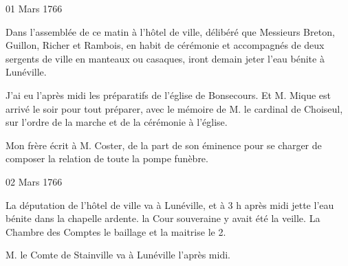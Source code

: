                      
                     \begin{diary}{01 Mars 1766}{}
                        
                         Dans l'assemblée de ce matin à
                              l'hôtel
                              de ville, délibéré que Messieurs
                           Breton, Guillon,
                           Richer et Rambois, en habit de cérémonie
                           et accompagnés de deux sergents de ville
                           en manteaux ou casaques,
                           iront demain
                           jeter l'eau bénite à Lunéville. \bigskip
        
        
                         J'ai eu l'après midi les préparatifs
                           de
                           l’église de
                              Bonsecours. Et M. Mique est
                           arrivé le soir pour tout préparer, avec
                           le mémoire de M. le cardinal de Choiseul,
                           sur l'ordre de la marche et de la
                           cérémonie à l’église. \bigskip
        
        
                        
                           Mon frère écrit à M.
                              Coster, de la part
                           de son éminence pour se charger de composer
                           la relation de toute la pompe funèbre. \bigskip
        
        
                     \end{diary}

                     \begin{diary}{02 Mars 1766}{}
                        
                         La députation de l'hôtel de
                              ville va à Lunéville,
                           et à 3 h après midi jette l'eau bénite dans
                           la chapelle ardente. la Cour
                              souveraine
                           y avait été la veille. La Chambre des Comptes
                           le
                              baillage et la
                              maitrise
                           le 2. \bigskip
        
        
                        
                           M. le Comte de Stainville va à
                              Lunéville
                           l'après midi. \bigskip
        
        
                     \end{diary}

